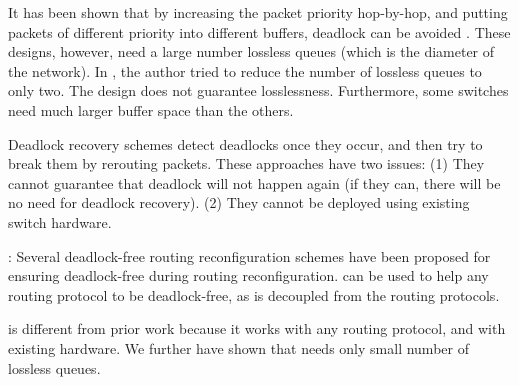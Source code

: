  It has been shown that by
increasing the packet priority hop-by-hop, and putting packets of different
priority into different buffers, deadlock can be avoided
\cite{firstpaper,survey,datanetworks,karol2003prevention}. These designs,
however, need a large number lossless queues (which is the diameter of the
network). In \cite{dag}, the author tried to reduce the number of lossless
queues to only two. The design does not guarantee losslessness. Furthermore,
some switches need much larger buffer space than the others. 

 Deadlock recovery schemes
\cite{isca95,shpiner2016unlocking,venkatramani1996,martinez1997,Lopez1998}
detect deadlocks once they occur, and then try to break them by rerouting
packets.  These approaches have two issues: (1) They cannot guarantee that
deadlock will not happen again (if they can, there will be no need for deadlock
recovery). (2) They cannot be deployed using existing switch hardware.



:
Several deadlock-free routing reconfiguration schemes
\cite{automatic,lysne2005,doublescheme,gara2005} have been proposed for
ensuring deadlock-free during routing reconfiguration. \sysname{} can
be used to help any routing protocol to be deadlock-free, as
\sysname{} is decoupled from the routing protocols.


 \sysname{} is different from prior work because it works with
any routing protocol, and with existing hardware. We further have shown that
\sysname{} needs only small number of lossless queues.



